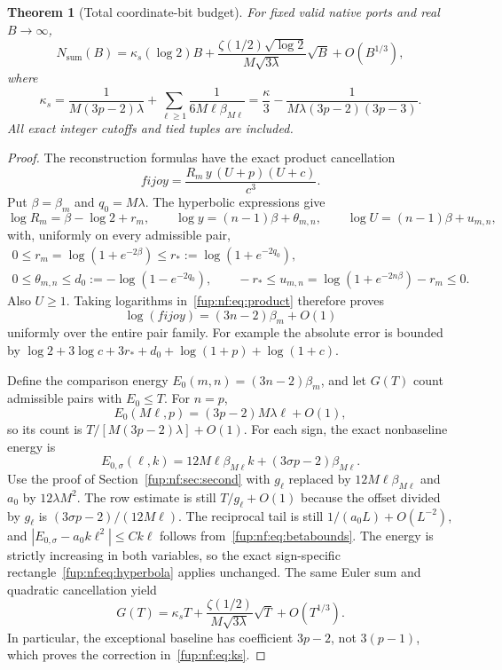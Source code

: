 \documentclass[11pt,letterpaper]{article}
\newtheorem{theorem}{Theorem}[section]
\theoremstyle{definition}\newtheorem{definition}[theorem]{Definition}
\theoremstyle{remark}\newtheorem{remark}[theorem]{Remark}
\begin{document}
\begin{theorem}[Total coordinate-bit budget]\label{fup:nf:thm:sumbits}
For fixed valid native ports and real $B\to\infty$,
\begin{equation}\label{fup:nf:eq:sumbits}
 N_{\mathrm{sum}}(B)=\kappa_s(\log2)B+
 \frac{\zeta(1/2)\sqrt{\log2}}{M\sqrt{3\lambda}}\sqrt B+O(B^{1/3}),
\end{equation}
where
\begin{equation}\label{fup:nf:eq:ks}
 \kappa_s=\frac1{M(3p-2)\lambda}
 +\sum_{\ell\ge1}\frac1{6M\ell\beta_{M\ell}}
 =\frac\kappa3-\frac1{M\lambda(3p-2)(3p-3)}.
\end{equation}
All exact integer cutoffs and tied tuples are included.
\end{theorem}
\begin{proof}
The reconstruction formulas have the exact product cancellation
\begin{equation}\label{fup:nf:eq:product}
 fijoy=\frac{R_m\,y\,(U+p)(U+c)}{c^3}.
\end{equation}
Put $\beta=\beta_m$ and $q_0=M\lambda$. The hyperbolic expressions give
\[
 \log R_m=\beta-\log2+r_m,\qquad
 \log y=(n-1)\beta+\theta_{m,n},\qquad
 \log U=(n-1)\beta+u_{m,n},
\]
with, uniformly on every admissible pair,
\[
\begin{gathered}
 0\le r_m=\log(1+e^{-2\beta})\le r_*:=\log(1+e^{-2q_0}),\\
 0\le\theta_{m,n}\le d_0:=-\log(1-e^{-2q_0}),\qquad
 -r_*\le u_{m,n}=\log(1+e^{-2n\beta})-r_m\le0.
\end{gathered}
\]
Also $U\ge1$. Taking logarithms in~\eqref{fup:nf:eq:product} therefore proves
\begin{equation}\label{fup:nf:eq:prodenergy}
 \log(fijoy)=(3n-2)\beta_m+O(1)
\end{equation}
uniformly over the entire pair family. For example the absolute error is bounded by
$\log2+3\log c+3r_*+d_0+\log(1+p)+\log(1+c)$.

Define the comparison energy $E_0(m,n)=(3n-2)\beta_m$, and let $G(T)$ count admissible pairs with $E_0\le T$. For $n=p$,
\[
 E_0(M\ell,p)=(3p-2)M\lambda\ell+O(1),
\]
so its count is $T/[M(3p-2)\lambda]+O(1)$. For each sign, the exact nonbaseline energy is
\[
 E_{0,\sigma}(\ell,k)=12M\ell\beta_{M\ell}k+(3\sigma p-2)\beta_{M\ell}.
\]
Use the proof of Section~\ref{fup:nf:sec:second} with $g_\ell$ replaced by $12M\ell\beta_{M\ell}$ and $a_0$ by $12\lambda M^2$. The row estimate is still $T/g_\ell+O(1)$ because the offset divided by $g_\ell$ is $(3\sigma p-2)/(12M\ell)$. The reciprocal tail is still $1/(a_0L)+O(L^{-2})$, and
$|E_{0,\sigma}-a_0k\ell^2|\le Ck\ell$ follows from~\eqref{fup:nf:eq:betabounds}. The energy is strictly increasing in both variables, so the exact sign-specific rectangle~\eqref{fup:nf:eq:hyperbola} applies unchanged. The same Euler sum and quadratic cancellation yield
\[
 G(T)=\kappa_sT+\frac{\zeta(1/2)}{M\sqrt{3\lambda}}\sqrt T+O(T^{1/3}).
\]
In particular, the exceptional baseline has coefficient $3p-2$, not $3(p-1)$, which proves the correction in~\eqref{fup:nf:eq:ks}.


\end{proof}
\end{document}
